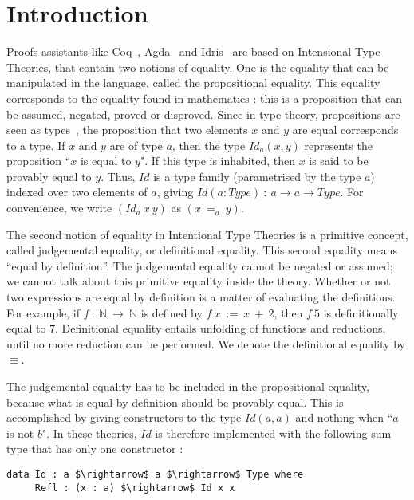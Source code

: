 \section{Introduction}

Proofs assistants like Coq~\cite{BertotC04}, Agda~\cite{DBLP:conf/tldi/Norell09} and Idris~\cite{brady2013idris} are based on Intensional Type Theories, that contain two notions of equality. One is the equality that can be manipulated in the language, called the propositional equality. This equality corresponds to the equality found in mathematics : this is a proposition that can be assumed, negated, proved or disproved. Since in type theory, propositions are seen as types~\cite{How80}, the
proposition that two elements $x$ and $y$ are equal corresponds to a type.
If $x$ and $y$ are of type $a$, then the type
$Id_a(x, y)$ represents the proposition ``$x$ is equal to $y$". If this type is
inhabited, then $x$ is said to be provably equal to $y$. Thus, $Id$ is a type family (parametrised by the type $a$) indexed over two elements of $a$, giving $Id (a:Type)\ :\ a \rightarrow a \rightarrow Type$. For
convenience, we write $(Id_a\ x\ y)$ as $(x\ =_a\ y)$. 

The second notion of equality in Intentional Type Theories is a primitive concept, called judgemental equality, or definitional equality. This second equality means ``equal by definition''. The judgemental equality cannot be negated or assumed; we cannot talk about this primitive equality inside the theory.
Whether or not two expressions are equal by definition is a matter of
evaluating the definitions. For example, if $f\ :\ \mathbb{N}\ \rightarrow\
\mathbb{N}$ is defined by $f\ x\ :=\ x\ +\ 2$, then $f\ 5$ is
definitionally equal to $7$. Definitional equality entails unfolding
of functions and reductions, until no more reduction can be
performed. We denote the definitional equality by $\equiv$.

The judgemental equality has to be included in the propositional equality, because what is equal by definition should be provably equal. This is accomplished by giving constructors to the type $Id(a,a)$ and nothing when ``$a$ is not $b$".
In these theories, $Id$ is therefore implemented with the following sum type that has only one constructor :

\begin{lstlisting}
data Id : a $\rightarrow$ a $\rightarrow$ Type where
     Refl : (x : a) $\rightarrow$ Id x x
\end{lstlisting}

